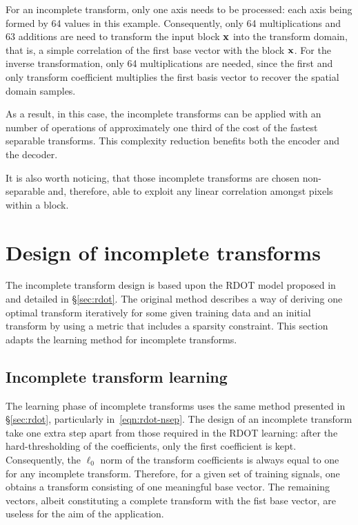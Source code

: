 \documentclass[11pt,a4paper,openright,twoside]{book}
\numberwithin{equation}{section} %
\numberwithin{figure}{section} %
\numberwithin{table}{section} %
\begin{document}
For an incomplete transform, only one axis needs to be processed:
each axis being formed by 64 values in this example.
Consequently, only 64 multiplications and 63 additions are need to transform
the input block $\mathbf{x}$ into the transform domain, that is, a simple correlation
of the first base vector with the block $\mathbf{x}$.
For the inverse transformation, only 64 multiplications are needed, since the
first and only transform coefficient multiplies the first basis vector to
recover the spatial domain samples.

As a result, in this case, the incomplete transforms can be applied with an
number of operations of approximately one third of the cost of the fastest
separable transforms.
This complexity reduction benefits both the encoder and the decoder.

It is also worth noticing, that those incomplete transforms are chosen
non-separable and, therefore, able to exploit any linear correlation amongst
pixels within a block.

\section{Design of incomplete transforms}
\label{sec:it_design_of_incomplete_transforms}

The incomplete transform design is based upon the \ac{RDOT} model proposed
in~\cite{sezer-08-sparse-orthonormal-transforms} and detailed in
\S\ref{sec:rdot}.
The original method describes a way of deriving one optimal transform
iteratively for some given training data and an initial transform by using a
metric that includes a sparsity constraint.
This section adapts the learning method for incomplete transforms.

\subsection{Incomplete transform learning}
\label{sub:it_incomplete_transform_learning}

The learning phase of incomplete transforms uses the same method presented in
\S\ref{sec:rdot}, particularly in~\eqref{eqn:rdot-nsep}.
The design of an incomplete transform take one extra step apart from those
required in the \ac{RDOT} learning:
after the hard-thresholding of the coefficients, only the first coefficient is
kept.
Consequently, the $\ell_0$ norm of the transform coefficients is always equal
to one for any incomplete transform.
Therefore, for a given set of training signals, one obtains a transform
consisting of one meaningful base vector.
The remaining vectors, albeit constituting a complete transform with the fist
base vector, are useless for the aim of the application.
\end{document}
